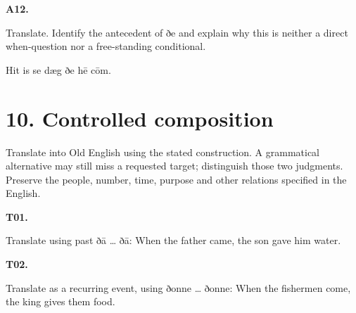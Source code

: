 \par\begin{minipage}{\linewidth}\raggedright
\textbf{A12.}

Translate. Identify the antecedent of ðe and explain why this is neither a direct when-question nor a free-standing conditional.

Hit is se dæg ðe hē cōm.

\end{minipage}\par\addvspace{4pt}

\section*{10. Controlled composition}

Translate into Old English using the stated construction. A grammatical alternative may still miss a requested target; distinguish those two judgments. Preserve the people, number, time, purpose and other relations specified in the English.

\par\begin{minipage}{\linewidth}\raggedright
\textbf{T01.}

Translate using past ðā … ðā: When the father came, the son gave him water.

\end{minipage}\par\addvspace{4pt}

\par\begin{minipage}{\linewidth}\raggedright
\textbf{T02.}

Translate as a recurring event, using ðonne … ðonne: When the fishermen come, the king gives them food.

\end{minipage}\par\addvspace{4pt}

